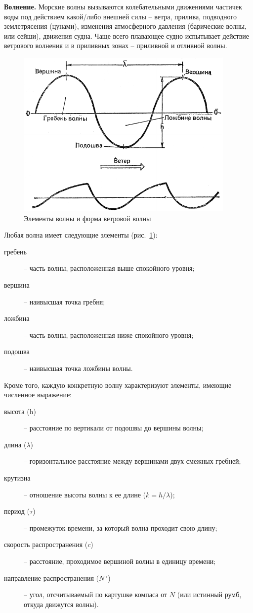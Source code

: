 \documentclass[a4paper, 12pt, twoside, final, book, russian, fittopage, cyremdash]{ncc}
\newcommand{\gr}{\ensuremath{\,^\circ}\xspace}
\newcommand{\ris}[1]{\ref{fig:#1}}
\begin{document}
\textbf{Волнение.} Морские волны вызываются колебательными движениями частичек воды под действием какой\-/либо внешней силы \--- ветра, прилива, подводного землетрясения (цунами), изменения атмосферного давления (барические волны, или сейши), движения судна. Чаще всего плавающее судно испытывает действие ветрового волнения и в приливных зонах \--- приливной и отливной волны.

\begin{figure}[htb]
  \centering{}
  \includegraphics[scale=1.2]{0124P}
  \caption{Элементы волны и форма ветровой волны}
  \label{fig:124}
\end{figure}

Любая волна имеет следующие элементы (рис.~\ris{124}):
\begin{description}
\item[гребень] \--- часть волны, расположенная выше спокойного уровня;
\item[вершина] \--- наивысшая точка гребня;
\item[ложбина] \--- часть волны, расположенная ниже спокойного уровня;
\item[подошва] \--- наивысшая точка ложбины волны.
\end{description}

Кроме того, каждую конкретную волну характеризуют элементы, имеющие численное выражение:
\begin{description}
\item[высота (h)] \--- расстояние по вертикали от подошвы до вершины волны;
\item[длина ($\lambda$)] \--- горизонтальное расстояние между вершинами двух смежных гребней;
\item[крутизна] \--- отношение высоты волны к ее длине ($k = h / \lambda$);
\item[период ($\tau$)] \--- промежуток времени, за который волна проходит свою длину;
\item[скорость распространения ($c$)] \--- расстояние, проходимое вершиной волны в единицу времени;
\item[направление распространения ($N\gr$)] \--- угол, отсчитываемый по картушке компаса от $N$ (или истинный румб, откуда движутся волны).
\end{description}
\end{document}
